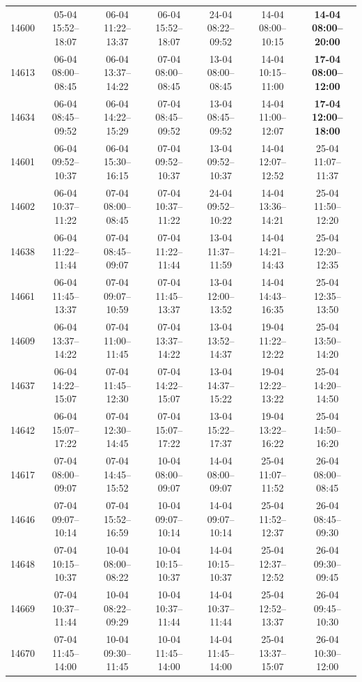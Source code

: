 \begin{table}[htbp]
\begin{tabular}{|r|c|c|c|c|c|c|}
14600 & 05-04 15:52--18:07 & 06-04 11:22--13:37 & 06-04 15:52--18:07 & 24-04 08:22--09:52 & 14-04 08:00--10:15 & \textbf{14-04 08:00--20:00} \\ 
14613 & 06-04 08:00--08:45 & 06-04 13:37--14:22 & 07-04 08:00--08:45 & 13-04 08:00--08:45 & 14-04 10:15--11:00 & \textbf{17-04 08:00--12:00} \\ 
14634 & 06-04 08:45--09:52 & 06-04 14:22--15:29 & 07-04 08:45--09:52 & 13-04 08:45--09:52 & 14-04 11:00--12:07 & \textbf{17-04 12:00--18:00} \\ 
14601 & 06-04 09:52--10:37 & 06-04 15:30--16:15 & 07-04 09:52--10:37 & 13-04 09:52--10:37 & 14-04 12:07--12:52 & 25-04 11:07--11:37 \\ 
14602 & 06-04 10:37--11:22 & 07-04 08:00--08:45 & 07-04 10:37--11:22 & 24-04 09:52--10:22 & 14-04 13:36--14:21 & 25-04 11:50--12:20 \\ 
14638 & 06-04 11:22--11:44 & 07-04 08:45--09:07 & 07-04 11:22--11:44 & 13-04 11:37--11:59 & 14-04 14:21--14:43 & 25-04 12:20--12:35 \\ 
14661 & 06-04 11:45--13:37 & 07-04 09:07--10:59 & 07-04 11:45--13:37 & 13-04 12:00--13:52 & 14-04 14:43--16:35 & 25-04 12:35--13:50 \\ 
14609 & 06-04 13:37--14:22 & 07-04 11:00--11:45 & 07-04 13:37--14:22 & 13-04 13:52--14:37 & 19-04 11:22--12:22 & 25-04 13:50--14:20 \\ 
14637 & 06-04 14:22--15:07 & 07-04 11:45--12:30 & 07-04 14:22--15:07 & 13-04 14:37--15:22 & 19-04 12:22--13:22 & 25-04 14:20--14:50 \\ 
14642 & 06-04 15:07--17:22 & 07-04 12:30--14:45 & 07-04 15:07--17:22 & 13-04 15:22--17:37 & 19-04 13:22--16:22 & 25-04 14:50--16:20 \\ 
14617 & 07-04 08:00--09:07 & 07-04 14:45--15:52 & 10-04 08:00--09:07 & 14-04 08:00--09:07 & 25-04 11:07--11:52 & 26-04 08:00--08:45 \\ 
14646 & 07-04 09:07--10:14 & 07-04 15:52--16:59 & 10-04 09:07--10:14 & 14-04 09:07--10:14 & 25-04 11:52--12:37 & 26-04 08:45--09:30 \\ 
14648 & 07-04 10:15--10:37 & 10-04 08:00--08:22 & 10-04 10:15--10:37 & 14-04 10:15--10:37 & 25-04 12:37--12:52 & 26-04 09:30--09:45 \\ 
14669 & 07-04 10:37--11:44 & 10-04 08:22--09:29 & 10-04 10:37--11:44 & 14-04 10:37--11:44 & 25-04 12:52--13:37 & 26-04 09:45--10:30 \\ 
14670 & 07-04 11:45--14:00 & 10-04 09:30--11:45 & 10-04 11:45--14:00 & 14-04 11:45--14:00 & 25-04 13:37--15:07 & 26-04 10:30--12:00 \\ 

\end{tabular}
\end{table}
